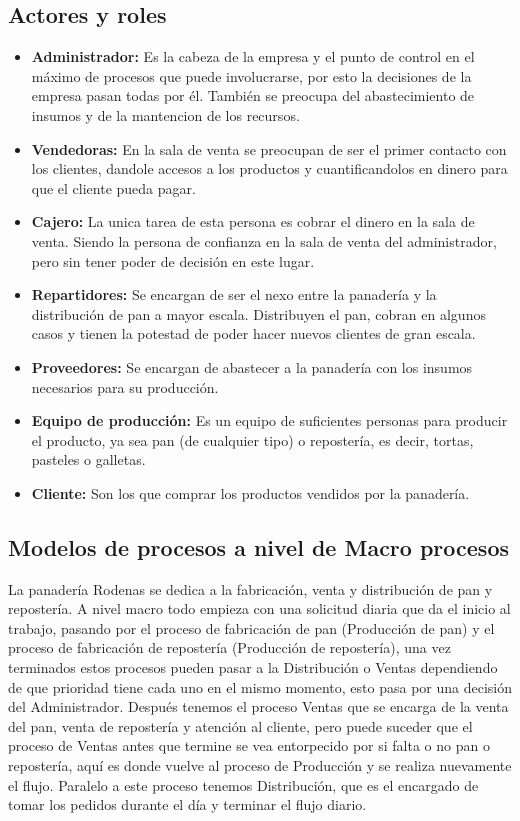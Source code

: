 \subsection{Actores y roles}
\begin{itemize}
\item \textbf{Administrador:} Es la cabeza de la empresa y el punto de control en el máximo de procesos que puede involucrarse, por esto la decisiones de la empresa pasan todas por él. También se preocupa del abastecimiento de insumos y de la mantencion de los recursos. 

\item \textbf{Vendedoras:} En la sala de venta se preocupan de ser el primer contacto con los clientes, dandole accesos a los productos y cuantificandolos en dinero para que el cliente pueda pagar.

\item \textbf{Cajero:} La unica tarea de esta persona es cobrar el dinero en la sala  de venta. Siendo  la persona de confianza en la sala de venta del administrador, pero sin tener poder de decisión en este lugar.

\item \textbf{Repartidores:} Se encargan de ser el nexo entre la panadería y la distribución de pan a mayor escala. Distribuyen el pan, cobran en algunos casos y tienen la potestad de poder hacer nuevos clientes de gran escala.

\item \textbf{Proveedores:} Se encargan de abastecer a la panadería con los insumos necesarios para su producción.

\item \textbf{Equipo de producción:} Es un equipo de suficientes personas para producir el producto, ya sea pan (de cualquier tipo) o repostería, es decir, tortas, pasteles o galletas.

\item \textbf{Cliente:} Son los que comprar los productos vendidos por la panadería.

\end{itemize}

\subsection{Modelos de procesos a nivel de Macro procesos}
La panadería Rodenas se dedica a la fabricación, venta y distribución de pan y repostería. A nivel macro todo empieza con una solicitud diaria que da el inicio al trabajo, pasando por el proceso de fabricación de pan (Producción de pan) y el proceso de fabricación de repostería (Producción de repostería), una vez terminados estos procesos pueden pasar a la Distribución o Ventas dependiendo de que prioridad tiene cada uno en el mismo momento, esto pasa por una decisión del Administrador. Después tenemos el proceso Ventas que se encarga de la venta del pan, venta de repostería y atención al cliente, pero puede suceder que el proceso de Ventas antes que termine se vea entorpecido por si falta o no pan o repostería, aquí es donde vuelve al proceso de Producción y se realiza nuevamente el flujo. Paralelo a este proceso tenemos Distribución, que es el encargado de tomar los pedidos durante el día y terminar el flujo diario.

